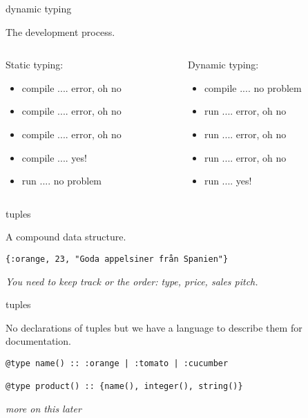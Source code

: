 \begin{frame}{dynamic typing}

  The development process. 
  \vspace{20pt}
  \begin{columns}
   \begin{column}{0.5\textwidth}
     Static typing: \pause
     \begin{itemize}
     \item compile .... error, oh no \pause
     \item compile .... error, oh no \pause
     \item compile .... error, oh no \pause
     \item compile .... yes! \pause
     \item run .... no problem \pause
     \end{itemize}
   \end{column}
   \begin{column}{0.5\textwidth}
     Dynamic typing: \pause
     \begin{itemize}
     \item compile .... no problem \pause
     \item run .... error, oh no \pause
     \item run .... error, oh no \pause
     \item run .... error, oh no \pause
     \item run .... yes! \pause       
     \end{itemize}
   \end{column}   
 \end{columns}

\end{frame}


\begin{frame}{tuples}

  A compound data structure. \pause

  \vspace{20pt}

  {\tt \{:orange, 23, "Goda appelsiner från Spanien"\}}  \pause

  \vspace{20pt}

  {\em You need to keep track or the order: type, price, sales pitch.}

\end{frame}

\begin{frame}[fragile]{tuples}

  No declarations of tuples but we have a language to describe them
  for documentation.\pause

  \vspace{20pt}  
  \begin{lstlisting}
@type name() :: :orange | :tomato | :cucumber

@type product() :: {name(), integer(), string()}
  \end{lstlisting}

  \pause
  \vspace{10pt}
  {\em more on this later}

\end{frame}

